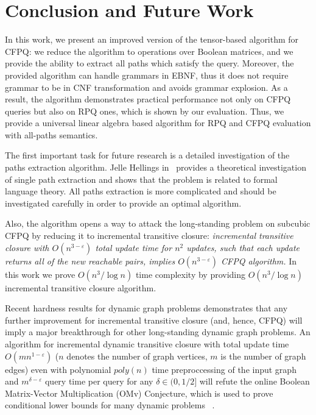 \section{Conclusion and Future Work}

In this work, we present an improved version of the tensor-based algorithm for CFPQ: we reduce the algorithm to operations over Boolean matrices, and we provide the ability to extract all paths which satisfy the query.
Moreover, the provided algorithm can handle grammars in EBNF, thus it does not require grammar to be in CNF transformation and avoids grammar explosion.
As a result, the algorithm demonstrates practical performance not only on CFPQ queries but also on RPQ ones, which is shown by our evaluation. 
Thus, we provide a universal linear algebra based algorithm for RPQ and CFPQ evaluation with all-paths semantics.

The first important task for future research is a detailed investigation of the paths extraction algorithm.
Jelle Hellings in~\cite{HellSinglePath} provides a theoretical investigation of single path extraction and shows that the problem is related to formal language theory.
All paths extraction is more complicated and should be investigated carefully in order to provide an optimal algorithm.

Also, the algorithm opens a way to attack the long-standing problem on subcubic CFPQ by reducing it to incremental transitive closure: \textit{incremental transitive closure with $O(n^{3-\varepsilon})$ total update time for $n^2$ updates, such that each update returns all of the new reachable pairs, implies $O(n^{3-\varepsilon})$ CFPQ algorithm.}
In this work we prove $O(n^3/\log{n})$ time complexity by providing $O(n^3/\log{n})$ incremental transitive closure algorithm. 

Recent hardness results for dynamic graph problems demonstrates that any further improvement for incremental transitive closure (and, hence, CFPQ) will imply a major breakthrough for other long-standing dynamic graph problems. An algorithm for incremental dynamic transitive closure with total update time $O(mn^{1-\varepsilon})$ ($n$ denotes the number of graph vertices, $m$ is the number of graph edges) even with polynomial $poly(n)$ time preproccessing of the input graph and $m^{\delta - \varepsilon}$ query time per query for any $\delta \in (0, 1/2]$ will refute the online Boolean Matrix-Vector Multiplication (OMv) Conjecture, which is used to prove conditional lower bounds for many dynamic problems ~\cite{8948597, 10.1145/2746539.2746609}.


